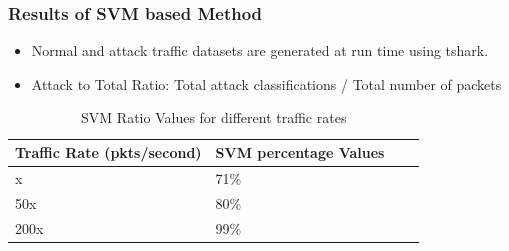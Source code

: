 \documentclass[10pt]{beamer}
\begin{document}
\begin{frame}
\frametitle{Results of SVM based Method}

\begin{itemize}
\footnotesize

\item
Normal and attack traffic datasets are generated at run time using tshark.

\item
Attack to Total Ratio: Total attack classifications / Total number of packets
\end{itemize}

\begin{table}
\scriptsize
\begin{center}
\begin{tabular}{ | m{2cm} | m{2cm}| m{2cm} | m{2cm} |} 
\hline
\textbf{Traffic Rate (pkts/second)} & \textbf{SVM percentage Values} \\
\hline
x &
71\% \\
\hline
50x &
80\% \\
\hline
200x &
99\% \\
\hline
\end{tabular}
\end{center}
\caption{\footnotesize SVM Ratio Values for different traffic rates}
\end{table}
\end{frame}
\end{document}
